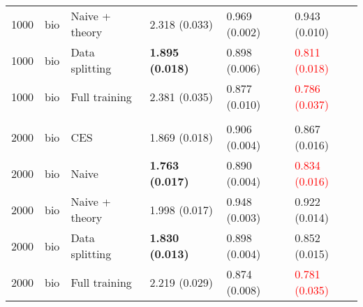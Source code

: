 \begin{tabular}[t]{rlllll}
\hspace{1em}1000 & bio & Naive + theory & 2.318 (0.033) & 0.969 (0.002) & 0.943 (0.010)\\
\hspace{1em}1000 & bio & Data splitting & \textbf{1.895 (0.018)} & 0.898 (0.006) & \textcolor{red}{0.811 (0.018)}\\
\hspace{1em}1000 & bio & Full training & 2.381 (0.035) & 0.877 (0.010) & \textcolor{red}{0.786 (0.037)}\\
\addlinespace[0.3em]
\multicolumn{6}{l}{\textbf{2000}}\\
\hspace{1em}2000 & bio & CES & 1.869 (0.018) & 0.906 (0.004) & 0.867 (0.016)\\
\hspace{1em}2000 & bio & Naive & \textbf{1.763 (0.017)} & 0.890 (0.004) & \textcolor{red}{0.834 (0.016)}\\
\hspace{1em}2000 & bio & Naive + theory & 1.998 (0.017) & 0.948 (0.003) & 0.922 (0.014)\\
\hspace{1em}2000 & bio & Data splitting & \textbf{1.830 (0.013)} & 0.898 (0.004) & 0.852 (0.015)\\
\hspace{1em}2000 & bio & Full training & 2.219 (0.029) & 0.874 (0.008) & \textcolor{red}{0.781 (0.035)}\\
\bottomrule
\end{tabular}

